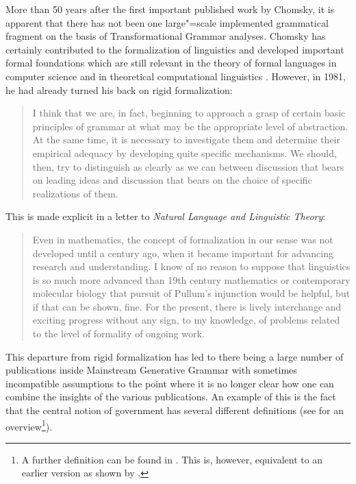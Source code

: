 More than 50 years after the first important published work by Chomsky, it is apparent that there has not been
one large"=scale implemented grammatical fragment on the basis of Transformational Grammar analyses. Chomsky
has certainly contributed to the formalization of linguistics and developed important formal foundations which
are still relevant in the theory of formal languages in computer science and
in theoretical computational linguistics \citep{Chomsky59a-u}. However, in 1981, he had already turned his back on rigid
formalization:
\begin{quote}
I think that we are, in fact, beginning to approach a grasp of certain 
basic principles of grammar at what may be the appropriate level of abstraction. At the same time, 
it is necessary to investigate them and determine their empirical adequacy by developing quite specific mechanisms.
We should, then, try to distinguish as clearly as we can between discussion that bears on leading ideas and
discussion that bears on the choice of specific realizations of them. \citep*[--3]{Chomsky81a}
\end{quote}
This is made explicit in a letter to \emph{Natural Language and Linguistic Theory}:
\begin{quote}
Even in mathematics, the concept of formalization in our sense was not
developed until a century ago, when it became important for advancing research
and understanding. I know of no reason to suppose that linguistics is so much
more advanced than 19th century mathematics or contemporary molecular
biology that pursuit of Pullum's injunction would be helpful, but if that can be
shown, fine. For the present, there is lively interchange and exciting progress
without any sign, to my knowledge, of problems related to the level of formality
of ongoing work. \citep[]{Chomsky90a}
\end{quote}
This departure from rigid formalization has led to there being a large number of publications inside
Mainstream Generative Grammar with sometimes incompatible assumptions to the point where it is no longer clear
how one can combine the insights of the various publications. 
An example of this is the fact that the central notion of government has several different definitions
(see  for an overview\footnote{%
A further definition can be found in . This is, however, equivalent to an earlier version as shown
by \citet[--106]{PP86a}.%
}).

